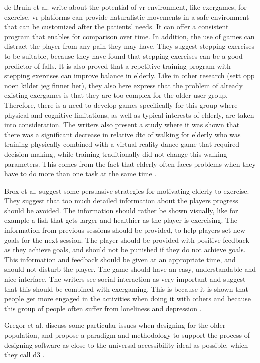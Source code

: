 de Bruin et al. \cite{bruin} write about the potential of \ac{vr} environment, like exergames, for exercise. \ac{vr} platforms can provide naturalistic movements in a safe environment that can be customized after the patients' needs. It can offer a consistent program that enables for comparison over time. In addition, the use of games can distract the player from any pain they may have. They suggest stepping exercises to be suitable, because they have found that stepping exercises can be a good predictor of falls. It is also proved that a repetitive training program with stepping exercises can improve balance in elderly. Like in other research (sett opp noen kilder jeg finner her), they also here express that the problem of already existing exergames is that they are too complex for the older user group. Therefore, there is a need to develop games specifically for this group where physical and cognitive limitations, as well as typical interests of elderly, are taken into consideration. The writers also present a study where it was shown that there was a significant decrease in relative \ac{dtc} of walking for elderly who was training physically combined with a virtual reality dance game that required decision making, while training traditionally did not change this walking parameters. This comes from the fact that elderly often faces problems when they have to do more than one task at the same time \cite{bruin}.

Brox et al. \cite{exergamesforelderly} suggest some persuasive strategies for motivating elderly to exercise. They suggest that too much detailed information about the players progress should be avoided. The information should rather be shown visually, like for example a fish that gets larger and healthier as the player is exercising. The information from previous sessions should be provided, to help players set new goals for the next session. The player should be provided with positive feedback as they achieve goals, and should not be punished if they do not achieve goals. This information and feedback should be given at an appropriate time, and should not  disturb the player. The game should have an easy, understandable and nice interface. The writers see social interaction as very important and suggest that this should be combined with exergaming. This is because it is shown that people get more engaged in the activities when doing it with others and because this group of people often suffer from loneliness and depression \cite{exergamesforelderly}. 

Gregor et al. \cite{gregor} discuss some particular issues when designing for the older population, and propose a paradigm and methodology to support the process of designing software as close to the universal accessibility ideal as possible, which they call \ac{d3} \cite{gregor}.

